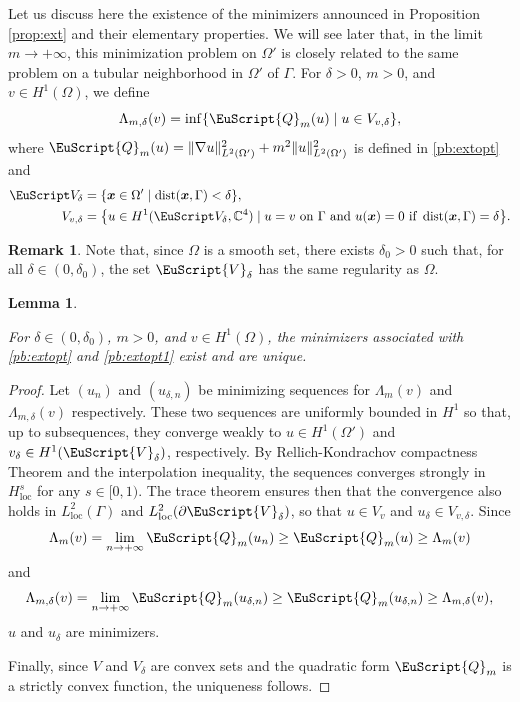\documentclass[10pt]{amsart}
\let\mathcal \EuScript
\newcommand{\cQ}{\mathcal{Q}}
\newcommand{\cV}{\mathcal{V}}
\DeclareMathOperator{\dist}{dist}
\newcommand{\loc}{\mathrm{loc}}
\let\sep\mid
\theoremstyle{plain}
\newtheorem{lemma}[theorem]{Lemma}
\theoremstyle{definition}
\newtheorem{remark}[theorem]{Remark}
\newcommand{\bx}{{\boldsymbol x}}
\begin{document}
Let us discuss here the existence of the minimizers announced in Proposition \ref{prop:ext} and their elementary properties. We will see later that, in the limit $m\to+\infty$, this minimization problem on $\Omega'$ is closely related to the same problem on a tubular neighborhood in $\Omega'$ of $\Gamma$. For $\delta>0$, $m>0$, and $v\in H^{1}(\Omega)$, we define
\begin{equation}\label{pb:extopt1}
\Lambda_{m,\delta}(v) = \inf\{
\cQ_{m}(u)\sep u\in V_{v,\delta}\},
\end{equation}
where $\cQ_m(u) = \|\nabla u\|^2_{L^2(\Omega')} + m^2\|u\|^2_{L^2(\Omega')}$
is defined in \eqref{pb:extopt}
and
\begin{equation*}
\begin{split} \mathcal V_{\delta} &= \{\bx\in\Omega'\sep\dist(\bx,\Gamma)<\delta\},\\
V_{v,\delta} &= \bigl\{
u\in H^1(\mathcal V_{\delta},\mathbb{C}^4) \sep u = v\mbox{ on }\Gamma\mbox{ and }u(\bx) =0\mbox{ if }\dist(\bx,\Gamma) = \delta
\bigr\}.
\end{split}
\end{equation*}

\begin{remark}\label{rem.regvoitub}
Note that, since $\Omega$ is a smooth set, there exists $\delta_0>0$ such that, for all $\delta\in(0,\delta_0)$, the set $\cV_\delta$ has the same regularity as $\Omega$.
\end{remark}


\begin{lemma}\label{lem.existence}

For $\delta\in(0,\delta_0)$, $m>0$, and $v\in H^1(\Omega)$,
the minimizers associated with \eqref{pb:extopt} and \eqref{pb:extopt1} exist and are unique.
\end{lemma}
\begin{proof}
Let $(u_n)$ and $(u_{\delta,n})$ be minimizing sequences for $\Lambda_{m}(v)$ and $\Lambda_{m,\delta}(v)$ respectively. These two sequences are uniformly bounded in $H^1$ so that, up to subsequences, they converge weakly to $u\in H^1(\Omega')$ and $v_\delta\in H^1(\cV_\delta)$, respectively. By Rellich-Kondrachov compactness Theorem and the interpolation inequality,
the sequences converges strongly in $H^{s}_\loc$ for any $s\in[0,1)$. The trace theorem ensures then that the convergence also holds in $L^2_\loc(\Gamma)$ and $L^2_\loc(\partial \cV_\delta)$, so that $u\in V_v$ and $u_\delta\in V_{v,\delta}$. Since
\[
\Lambda_m(v) = \lim_{n\to+\infty} \cQ_m(u_n)\geq \cQ_m(u)\geq \Lambda_m(v)
\]
and
\[
\Lambda_{m,\delta}(v) = \lim_{n\to+\infty} \cQ_{m}(u_{\delta,n})\geq \cQ_{m}(u_{\delta,n})\geq \Lambda_{m,\delta}(v),
\]
$u$ and $u_\delta$ are minimizers.

Finally, since $V$ and $V_\delta$ are convex sets and the quadratic form $\cQ_m$ is a strictly convex function, the uniqueness follows.
\end{proof}
\end{document}

